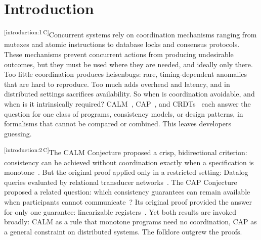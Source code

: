 \documentclass[sigconf]{cidr-2027}
\theoremstyle{remark}
\newcommand{\cxtag}[2]{\textsuperscript{\textsf{\tiny[#1\,#2]}}}
\begin{document}

\maketitle
{}\par

\section{Introduction}
\label{sec:intro}

\color{black!45}\cxtag{introduction:1}{C}Concurrent systems rely on coordination mechanisms ranging from mutexes and
atomic instructions to database locks and consensus protocols.  These mechanisms
prevent concurrent actions from producing undesirable outcomes, but they must be
used where they are needed, and ideally only there.  Too little coordination
produces heisenbugs: rare, timing-dependent anomalies that are hard to
reproduce.  Too much adds overhead and latency, and in distributed settings
sacrifices availability.  So when is coordination avoidable, and when is it
intrinsically required?  CALM~\cite{ameloot2013relational},
CAP~\cite{gilbert2002cap}, and CRDTs~\cite{shapiro2011crdt} each answer the
question for one class of programs, consistency models, or design patterns, in
formalisms that cannot be compared or combined.  This leaves developers
guessing.\color{black}

\color{black!45}\cxtag{introduction:2}{C}The CALM Conjecture proposed a crisp, bidirectional criterion:
consistency can be achieved without coordination exactly when a specification
is monotone~\cite{hellerstein2010declarative}.  But the original proof applied
only in a restricted setting: Datalog queries evaluated by relational transducer
networks~\cite{ameloot2013relational,hellerstein2020keeping}.  The CAP
Conjecture proposed a related question: which consistency guarantees can remain
available when participants cannot
communicate~\cite{brewer2000towards,brewer2012cap}?  Its original proof
provided the answer for only one guarantee: linearizable
registers~\cite{gilbert2002cap}.  Yet both results are invoked broadly: CALM as a
rule that monotone programs need no coordination, CAP as a general constraint
on distributed systems. The folklore outgrew the proofs.\color{black}
\end{document}
